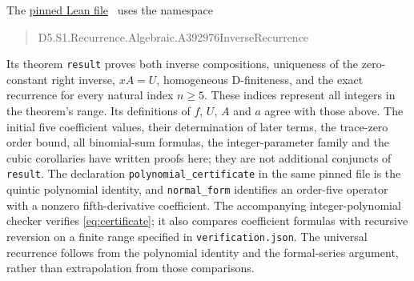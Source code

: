\documentclass[10pt]{article}
\begin{document}
The \href{https://github.com/the-omega-institute/trureturing/blob/2b5b552e72596710282b713f6587c7020544535d/D5/S1/Recurrence/Algebraic/A392976InverseRecurrence.lean}{pinned Lean file}~\cite{lean} uses the namespace
\begin{quote}\ttfamily
D5.S1.Recurrence.Algebraic.A392976InverseRecurrence
\end{quote}
Its theorem \texttt{result} proves both inverse compositions, uniqueness of the zero-constant right
inverse, $xA=U$, homogeneous D-finiteness, and the exact recurrence for every
natural index $n\geq5$. These indices represent all integers in the theorem's
range. Its definitions of $f$, $U$, $A$ and $a$ agree with those above.
The initial five coefficient values, their determination of later terms,
the trace-zero order bound, all binomial-sum formulas, the integer-parameter family and the cubic
corollaries have written proofs here; they are not additional conjuncts of
\texttt{result}. The declaration \texttt{polynomial\_certificate}
in the same pinned file is the quintic polynomial identity, and
\texttt{normal\_form} identifies an order-five operator with a nonzero
fifth-derivative coefficient. The accompanying integer-polynomial checker verifies
\eqref{eq:certificate}; it also compares coefficient formulas with recursive
reversion on a finite range specified in \texttt{verification.json}.
The universal recurrence follows from the polynomial identity and the
formal-series argument, rather than extrapolation from those comparisons.
\end{document}
